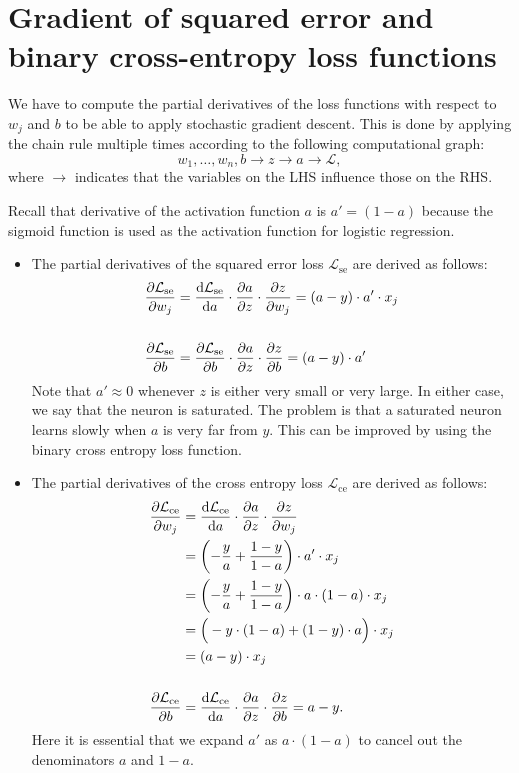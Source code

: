 \documentclass[12pt]{article}
\begin{document}
\section{Gradient of squared error and binary cross-entropy loss functions}

We have to compute the partial derivatives of the loss functions with respect to $w_j$ and $b$ to be able to apply stochastic gradient descent. This is done by applying the chain rule multiple times according to the following computational graph: 
\begin{equation}
w_1,\ldots,w_n, b \rightarrow z \rightarrow a \rightarrow \mathcal{L},
\end{equation}
where $\rightarrow$ indicates that the variables on the LHS influence those on the RHS.

Recall that derivative of the activation function $a$ is $a' = (1-a)$ because the sigmoid function is used as the activation function for logistic regression.
\begin{itemize}
\item 
The partial derivatives of the squared error loss $\mathcal{L}_\mathrm{se}$ are derived as follows:
\begin{align}
{\partial \mathcal{L}_\mathrm{se} \over \partial w_j}
&=  
{\mathrm{d} \mathcal{L}_\mathrm{se} \over \mathrm{d}a} \cdot {\partial a \over \partial z} \cdot {\partial z \over \partial w_j} =
(a - y) \cdot a' \cdot x_j  \\
& \notag \\
%
{\partial \mathcal{L}_\mathrm{se} \over \partial b} 
&=
{\partial \mathcal{L}_\mathrm{se} \over \partial b} \cdot  {\partial a \over \partial z} \cdot {\partial z \over \partial b} =
(a - y) \cdot a'
\end{align}
Note that $a'\approx 0$ whenever $z$ is either very small or very large. In either case, we say that the neuron is saturated. The problem is that a saturated neuron learns slowly when $a$ is very far from $y$. This can be improved by using the binary cross entropy loss function.
\item
The partial derivatives of the cross entropy loss $\mathcal{L}_\mathrm{ce}$ are derived as follows:
\begin{align}
{\partial \mathcal{L}_\mathrm{ce} \over \partial w_j}
&=  
{\mathrm{d} \mathcal{L}_\mathrm{ce} \over \mathrm{d}a} \cdot {\partial a \over \partial z} \cdot {\partial z \over \partial w_j} \\
&= 
\left(-\frac{y}{a} + \frac{1-y}{1-a} \right) \cdot a' \cdot x_j  \\
&=
\left(-\frac{y}{a} + \frac{1-y}{1-a} \right) \cdot a \cdot (1 - a) \cdot x_j  \\
&=
\Big( - y \cdot  (1 - a) + (1-y) \cdot a \Big) \cdot x_j \\
&=
(a - y) \cdot x_j \\
%
& \notag \\
{\partial \mathcal{L}_\mathrm{ce} \over \partial b} 
&=
{\mathrm{d} \mathcal{L}_\mathrm{ce} \over \mathrm{d}a} \cdot {\partial a \over \partial z} \cdot {\partial z \over \partial b} = 
a - y.
\end{align}
Here it is essential that we expand $a'$ as $a \cdot (1-a)$ to cancel out the denominators $a$ and $1-a$.
\end{itemize}
\end{document}
